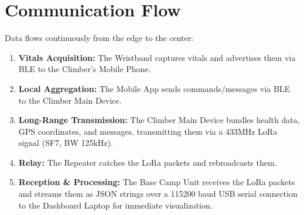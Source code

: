 \section{Communication Flow}
Data flows continuously from the edge to the center:
\begin{enumerate}
    \item \textbf{Vitals Acquisition:} The Wristband captures vitals and advertises them via BLE to the Climber's Mobile Phone.
    \item \textbf{Local Aggregation:} The Mobile App sends commands/messages via BLE to the Climber Main Device.
    \item \textbf{Long-Range Transmission:} The Climber Main Device bundles health data, GPS coordinates, and messages, transmitting them via a 433MHz LoRa signal (SF7, BW 125kHz).
    \item \textbf{Relay:} The Repeater catches the LoRa packets and rebroadcasts them.
    \item \textbf{Reception \& Processing:} The Base Camp Unit receives the LoRa packets and streams them as JSON strings over a 115200 baud USB serial connection to the Dashboard Laptop for immediate visualization.
\end{enumerate}
